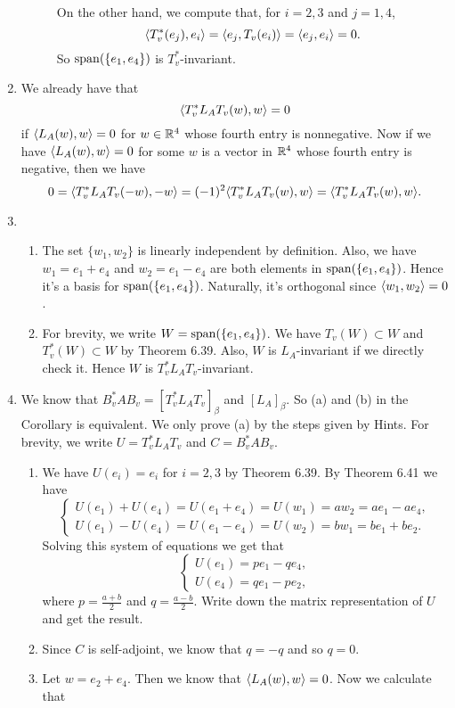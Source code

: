 \begin{enumerate}
\begin{description}
On the other hand, we compute that, for $i=2,3$ and $j=1,4$,
\[\lag T_v^*(e_j),e_i\rag =\lag e_j,T_v(e_i)\rag =\lag e_j,e_i\rag =0.\]
So $\sp(\{e_1,e_4\})$ is $T_v^*$-invariant.
\end{description}
\item We already have that 
\[\lag T_v^*L_AT_v(w),w\rag =0\]
if $\lag L_A(w),w\rag =0$ for $w\in \R^4$ whose fourth entry is nonnegative. Now if we have $\lag L_A(w),w\rag =0$ for some $w$ is a vector in $\R^4$ whose fourth entry is negative, then we have 
\[0=\lag T_v^*L_AT_v(-w),-w\rag =(-1)^2\lag T_v^*L_AT_v(w),w\rag=\lag T_v^*L_AT_v(w),w\rag .\]
\item \begin{enumerate}
\item The set $\{w_1,w_2\}$ is linearly independent by definition. Also, we have $w_1=e_1+e_4$ and $w_2=e_1-e_4$ are both elements in $\sp(\{e_1,e_4\})$. Hence it's a basis for $\sp(\{e_1,e_4\})$. Naturally, it's orthogonal since $\lag w_1,w_2\rag =0$.
\item For brevity, we write $W=\sp(\{e_1,e_4\})$. We have $T_v(W)\subset W$ and $T_v^*(W)\subset W$ by Theorem 6.39. Also, $W$ is $L_A$-invariant if we directly check it. Hence $W$ is $T_v^*L_AT_v$-invariant.
\end{enumerate}
\item We know that $B_v^*AB_v=[T_v^*L_AT_v]_{\beta}$ and $[L_A]_{\beta}$. So (a) and (b) in the Corollary is equivalent. We only prove (a) by the steps given by Hints. For brevity, we write $U=T_v^*L_AT_v$ and $C=B_v^*AB_v$.
\begin{enumerate}
\item We have $U(e_i)=e_i$ for $i=2,3$ by Theorem 6.39. By Theorem 6.41 we have 
\[\left\{\begin{array}{c}U(e_1)+U(e_4)=U(e_1+e_4)=U(w_1)=aw_2=ae_1-ae_4,\\U(e_1)-U(e_4)=U(e_1-e_4)=U(w_2)=bw_1=be_1+be_2.\end{array}\right.\]
Solving this system of equations we get that 
\[\left\{\begin{array}{c}U(e_1)=pe_1-qe_4,\\U(e_4)=qe_1-pe_2,\end{array}\right.\]
where $p=\frac{a+b}{2}$ and $q=\frac{a-b}{2}$. Write down the matrix representation of $U$ and get the result.
\item Since $C$ is self-adjoint, we know that $q=-q$ and so $q=0$.
\item Let $w=e_2+e_4$. Then we know that $\lag L_A(w),w\rag =0$. Now we calculate that 

\end{enumerate}
\end{enumerate}
